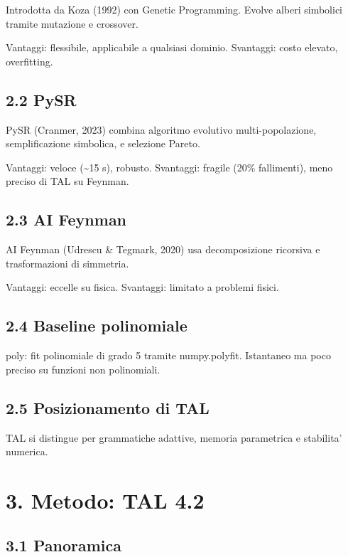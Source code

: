\documentclass[
]{article}
\begin{document}
Introdotta da Koza (1992) con Genetic Programming. Evolve alberi
simbolici tramite mutazione e crossover.

Vantaggi: flessibile, applicabile a qualsiasi dominio. Svantaggi: costo
elevato, overfitting.

\subsection{2.2 PySR}\label{pysr}

PySR (Cranmer, 2023) combina algoritmo evolutivo multi-popolazione,
semplificazione simbolica, e selezione Pareto.

Vantaggi: veloce (\textasciitilde15 s), robusto. Svantaggi: fragile
(20\% fallimenti), meno preciso di TAL su Feynman.

\subsection{2.3 AI Feynman}\label{ai-feynman}

AI Feynman (Udrescu \& Tegmark, 2020) usa decomposizione ricorsiva e
trasformazioni di simmetria.

Vantaggi: eccelle su fisica. Svantaggi: limitato a problemi fisici.

\subsection{2.4 Baseline polinomiale}\label{baseline-polinomiale}

poly: fit polinomiale di grado 5 tramite numpy.polyfit. Istantaneo ma
poco preciso su funzioni non polinomiali.

\subsection{2.5 Posizionamento di TAL}\label{posizionamento-di-tal}

TAL si distingue per grammatiche adattive, memoria parametrica e
stabilita' numerica.

\section{3. Metodo: TAL 4.2}\label{metodo-tal-4.2}

\subsection{3.1 Panoramica}\label{panoramica-1}
\end{document}
